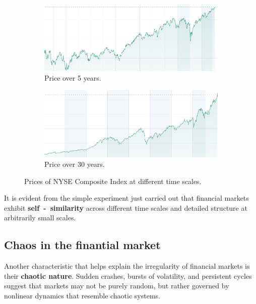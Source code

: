 \begin{itemize}
\begin{figure}[htbp]
    \begin{subfigure}{0.45\textwidth}
        \centering
        \includegraphics[width=\linewidth]{img/5y.png}
        \caption{Price over 5 years.}
    \end{subfigure}
    \hfill
    \begin{subfigure}{0.45\textwidth}
        \centering
        \includegraphics[width=\linewidth]{img/30y.png}
        \caption{Price over 30 years.}
    \end{subfigure}
        \caption{Prices of NYSE Composite Index at different time scales.}
    \label{fig:siximages}
\end{figure}
    It is evident from the simple experiment just carried out that financial markets exhibit \textbf{self~-~similarity} across different time scales and detailed structure at arbitrarily small scales.
\end{itemize}

\subsection{Chaos in the finantial market}
Another characteristic that helps explain the irregularity of financial markets is their \textbf{chaotic nature}. Sudden crashes, bursts of volatility, and persistent cycles suggest that markets may not be purely random, but rather governed by nonlinear dynamics that resemble chaotic systems.\\

